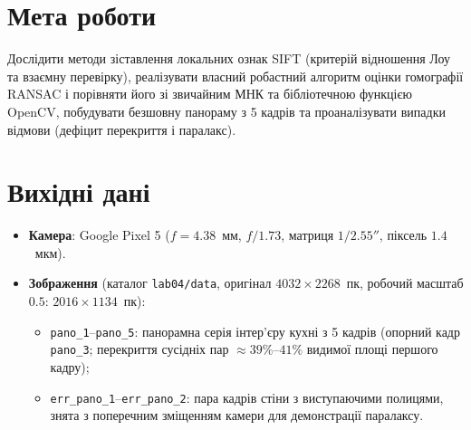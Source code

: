 \documentclass[14pt, a4paper]{extarticle}
\begin{document}


\section{Мета роботи}
Дослідити методи зіставлення локальних ознак SIFT (критерій відношення Лоу та взаємну перевірку), реалізувати власний робастний алгоритм оцінки гомографії RANSAC і порівняти його зі звичайним МНК та бібліотечною функцією OpenCV, побудувати безшовну панораму з 5 кадрів та проаналізувати випадки відмови (дефіцит перекриття і паралакс).

\section{Вихідні дані}
\begin{itemize}
    \item \textbf{Камера}: Google Pixel 5 ($f = 4.38$~мм, $f/1.73$, матриця $1/2.55''$, піксель $1.4$~мкм).
    \item \textbf{Зображення} (каталог \texttt{lab04/data}, оригінал $4032 \times 2268$~пк, робочий масштаб $0.5$: $2016 \times 1134$~пк):
    \begin{itemize}
        \item \texttt{pano\_1}--\texttt{pano\_5}: панорамна серія інтер'єру кухні з 5 кадрів (опорний кадр \texttt{pano\_3}; перекриття сусідніх пар $\approx 39\%$--$41\%$ видимої площі першого кадру);
        \item \texttt{err\_pano\_1}--\texttt{err\_pano\_2}: пара кадрів стіни з виступаючими полицями, знята з поперечним зміщенням камери для демонстрації паралаксу.
    \end{itemize}
\end{itemize}
\end{document}
